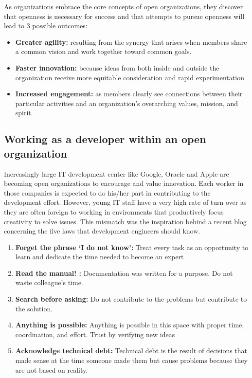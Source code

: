 \documentclass[]{book}
\providecommand{\tightlist}{%
  \setlength{\itemsep}{0pt}\setlength{\parskip}{0pt}}
\let\BeginKnitrBlock\begin \let\EndKnitrBlock\end
\begin{document}
As organizations embrace the core concepts of open organizations, they discover that openness is necessary for success and that attempts to pursue openness will lead to 3 possible outcomes: \citep{OOA2017}

\begin{itemize}
\item
  \textbf{Greater agility:} resulting from the synergy that arises when members share a common vision and work together toward common goals.
\item
  \textbf{Faster innovation:} because ideas from both inside and outside the organization receive more equitable consideration and rapid experimentation
\item
  \textbf{Increased engagement:} as members clearly see connections between their particular activities and an organization's overarching values, mission, and spirit.
\end{itemize}

\BeginKnitrBlock{rmdextra}
\hypertarget{working-as-a-developer-within-an-open-organization}{%
\section*{Working as a developer within an open organization}\label{working-as-a-developer-within-an-open-organization}}

Increasingly large IT development center like Google, Oracle and Apple are becoming open organizations to encourage and value innovation. Each worker in those companies is expected to do his/her part in contributing to the development effort. However, young IT staff have a very high rate of turn over as they are often foreign to working in environments that productively focus creativity to solve issues. This mismatch was the inspiration behind a recent blog concerning the five laws that development engineers should know. \citep{Short2017}

\begin{enumerate}
\def\labelenumi{\arabic{enumi}.}
\tightlist
\item
  \textbf{Forget the phrase `I do not know':} Treat every task as an opportunity to learn and dedicate the time needed to become an expert
\item
  \textbf{Read the manual! :} Documentation was written for a purpose. Do not waste colleague's time.
\item
  \textbf{Search before asking:} Do not contribute to the problems but contribute to the solution.
\item
  \textbf{Anything is possible:} Anything is possible in this space with proper time, coordination, and effort. Trust by verifying new ideas
\item
  \textbf{Acknowledge technical debt:} Technical debt is the result of decisions that made sense at the time someone made them but cause problems because they are not based on reality.
\end{enumerate}
\EndKnitrBlock{rmdextra}
\end{document}

